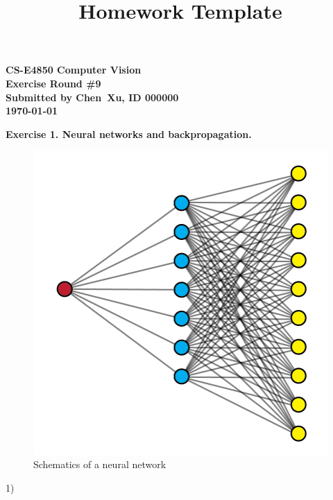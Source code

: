 \documentclass[letterpaper, 11pt]{article}
\begin{document}
\title{Homework Template}

\begin{center}
    {
        \large
        \bf
        CS-E4850 Computer Vision\\
        Exercise Round \#9\\
        Submitted by Chen\ Xu, ID 000000\\
        \today
    }
\end{center}
\bigskip
\textbf{Exercise 1. Neural networks and backpropagation.}

\begin{figure}[H]
    \centering
    \includegraphics{ex9NN-01.png}
    \caption{Schematics of a neural network}
    \label{fig:schematics}
\end{figure}

1)
\end{document}
